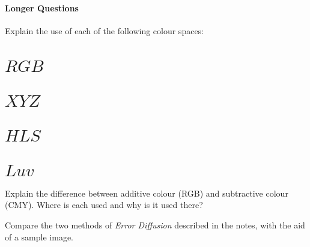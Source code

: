 \documentclass{supervision}
\begin{document}
\subsection*{Longer Questions}
\begin{questions}
    \question
    Explain the use of each of the following colour spaces:
    \begin{parts}
        \part{$RGB$}
        \part{$XYZ$}
        \part{$HLS$}
        \part{$Luv$}
    \end{parts}
    \question
    Explain the difference between additive colour (RGB) and subtractive colour (CMY). Where is each used and why is it used there?

    \question
    Compare the two methods of \emph{Error Diffusion} described in the notes, with the aid of a sample image.

\end{questions}
\end{document}
